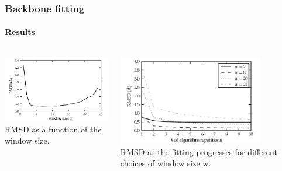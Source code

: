 \documentclass{beamer}
\begin{document}
\begin{frame}[t, fragile]
\frametitle{Backbone fitting} 
\framesubtitle{Results}
\vspace*{5mm}
\begin{columns}[t]
\column{2.3in}
\centering
\hspace*{-3mm}
\includegraphics[width=2.5in]{plot_rmsd}\\
\small{RMSD as a function of the window size.}

\column{2.3in}
\centering
\hspace*{-.4cm}\includegraphics[width=2.5in]{plot_rmsd_convergence}\\
\small{RMSD as the fitting progresses for different
choices of window size w.}
\end{columns}
\end{frame}
\end{document}
